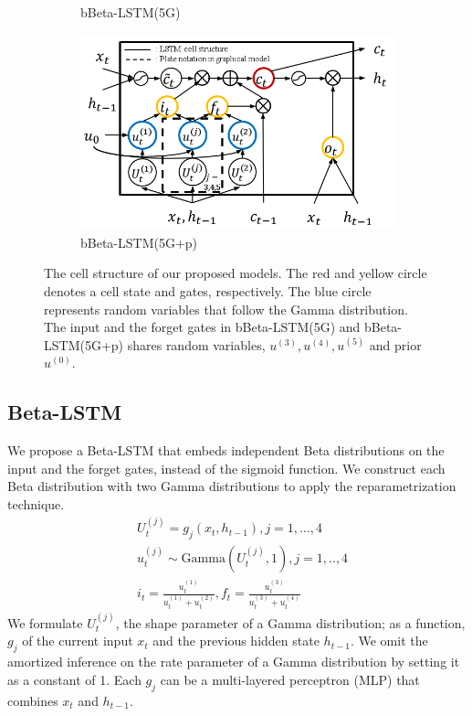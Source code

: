 \documentclass[letterpaper]{article} %
\begin{document}
\begin{figure}[t!]
\begin{subfigure}{.48\columnwidth}
		\caption{bBeta-LSTM(5G)}
	\end{subfigure}\hfil
	\begin{subfigure}{.48\columnwidth}
		\centering
		\includegraphics[width=\linewidth]{bBLSTM_5G_prior_cell.png}
		\caption{bBeta-LSTM(5G+p)}
		\label{fig:bBLSTM(5G)_prior_cell}
	\end{subfigure}
	\caption{The cell structure of our proposed models. The red and yellow circle denotes a cell state and gates, respectively. The blue circle represents random variables that follow the Gamma distribution. The input and the forget gates in bBeta-LSTM(5G) and bBeta-LSTM(5G+p) shares random variables, $u^{(3)},u^{(4)},u^{(5)}$ and prior $u^{(0)}$.}
	\label{fig:our_cell_structure}
\end{figure}
\subsection{Beta-LSTM}
We propose a Beta-LSTM that embeds independent Beta distributions on the input and the forget gates,  instead of the sigmoid function. We construct each Beta distribution with two Gamma distributions to apply the reparametrization technique.
\begin{align}
	&U_{t}^{(j)} = g_{j}(x_{t},h_{t-1}), j=1,...,4 \label{eq:U}\\
	&u_{t}^{(j)} \sim \text{Gamma}(U_{t}^{(j)},1), j=1,..,4 \label{eq:u}\\
	&i_{t} = \frac{u_{t}^{(1)}}{u_{t}^{(1)}+u_{t}^{(2)}}, f_{t} = \frac{u_{t}^{(3)}}{u_{t}^{(3)}+u_{t}^{(4)}}
\end{align}
We formulate $U_{t}^{(j)}$, the shape parameter of a Gamma distribution; as a function, $g_j$ of the current input $x_{t}$ and the previous hidden state $h_{t-1}$. We omit the amortized inference on the rate parameter of a Gamma distribution by setting it as a constant of 1. Each $g_{j}$ can be a multi-layered perceptron (MLP) that combines $x_{t}$ and $h_{t-1}$.
\end{document}
